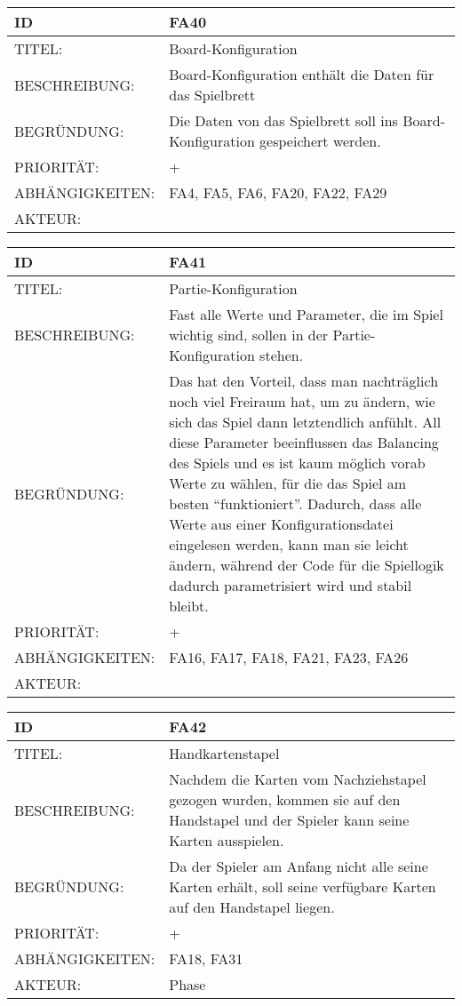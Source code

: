 \documentclass{uulm-assignment}
\begin{document}
    
    \begin{tabularx}{\textwidth}{|l|X |} \hline
        \textbf{ID} & \textbf{FA40} \\
        \hline
        TITEL: & Board-Konfiguration \\
        \hline
        BESCHREIBUNG: & Board-Konfiguration enthält die Daten für das Spielbrett
        \\
        \hline
        BEGRÜNDUNG: & Die Daten von das Spielbrett soll ins Board-Konfiguration gespeichert werden.\\
        \hline
        PRIORITÄT: & +\\
        \hline
        ABHÄNGIGKEITEN: & FA4, FA5, FA6, FA20, FA22, FA29 \\
        \hline
        AKTEUR: & \\
        \hline
    \end{tabularx}
    
    \begin{tabularx}{\textwidth}{|l|X |} \hline
        \textbf{ID} & \textbf{FA41} \\
        \hline
        TITEL: &  Partie-Konfiguration\\
        \hline
        BESCHREIBUNG: & Fast alle Werte und Parameter, die im Spiel wichtig sind, sollen in der Partie-Konfiguration stehen.
        \\
        \hline
        BEGRÜNDUNG: & Das hat den Vorteil, dass man nachträglich noch viel Freiraum hat, um zu ändern, wie sich das Spiel
dann letztendlich anfühlt. All diese Parameter beeinflussen das Balancing des Spiels und es ist kaum
möglich vorab Werte zu wählen, für die das Spiel am besten “funktioniert”. Dadurch, dass alle Werte
aus einer Konfigurationsdatei eingelesen werden, kann man sie leicht ändern, während der Code
für die Spiellogik dadurch parametrisiert wird und stabil bleibt.  \\
        \hline
        PRIORITÄT: & +\\
        \hline
        ABHÄNGIGKEITEN: & FA16, FA17, FA18, FA21, FA23, FA26\\
        \hline
        AKTEUR: & \\
        \hline
    \end{tabularx}
    
    \begin{tabularx}{\textwidth}{|l|X |} \hline
        \textbf{ID} & \textbf{FA42} \\
        \hline
        TITEL: & Handkartenstapel\\
        \hline
        BESCHREIBUNG: & Nachdem die Karten vom Nachziehstapel gezogen wurden, kommen sie auf den Handstapel und der Spieler kann seine Karten ausspielen.
        \\
        \hline
        BEGRÜNDUNG: & Da der Spieler am Anfang nicht alle seine Karten erhält, soll seine verfügbare Karten auf den Handstapel liegen. \\
        \hline
        PRIORITÄT: & +\\
        \hline
        ABHÄNGIGKEITEN: & FA18, FA31\\
        \hline
        AKTEUR: & Phase\\
        \hline
    \end{tabularx}
    
\end{document}
